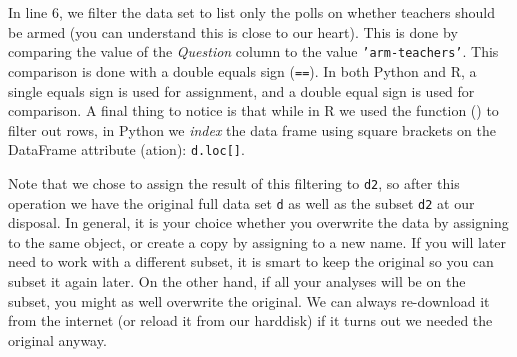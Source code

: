 In line 6, we filter the data set to list only the polls on whether teachers should be armed
(you can understand this is close to our heart).
This is done by comparing the value of the \emph{Question} column to the value \texttt{'arm-teachers'}.
This comparison is done with a double equals sign (\verb+==+).
In both Python and R, a single equals sign is used for assignment,
and a double equal sign is used for comparison.
A final thing to notice is that while in R we used the  function () to filter out rows,
in Python we \emph{index} the data frame using square brackets on the  DataFrame attribute (ation): \verb+d.loc[]+.

Note that we chose to assign the result of this filtering to \texttt{d2},
so after this operation we have the original full data set \texttt{d} as well as the subset \texttt{d2} at our disposal.
In general, it is your choice whether you overwrite the data by assigning to the same object,
or create a copy by assigning to a new name.
If you will later need to work with a different subset, it is smart to keep the original so you can subset it again later.
On the other hand, if all your analyses will be on the subset, you might as well overwrite the original.
We can always re-download it from the internet (or reload it from our harddisk) if it turns out we needed the original anyway. 



